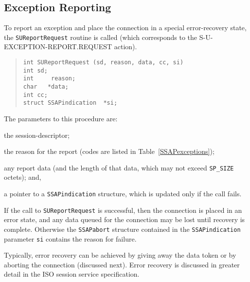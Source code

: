 \subsection	{Exception Reporting}
To report an exception and place the connection in a special error-recovery
state,
the \verb"SUReportRequest" routine is called
(which corresponds to the {\sf S-U-EXCEPTION-REPORT.REQUEST\/} action).
\begin{quote}\small\begin{verbatim}
int	SUReportRequest (sd, reason, data, cc, si)
int	sd;
int     reason;
char   *data;
int	cc;
struct SSAPindication  *si;
\end{verbatim}\end{quote}
The parameters to this procedure are:
\begin{describe}
\item[\verb"sd":] the session-descriptor;

\item[\verb"reason":] the reason for the report
(codes are listed in Table~\ref{SSAPexceptions});

\item[\verb"data"/\verb"cc":] any report data
(and the length of that data, which may not exceed \verb"SP_SIZE" octets);
and,

\item[\verb"si":] a pointer to a \verb"SSAPindication" structure, which is
updated only if the call fails.
\end{describe}
If the call to \verb"SUReportRequest" is successful,
then the connection is placed in an error state,
and any data queued for the connection may be lost until recovery is complete.
Otherwise the \verb"SSAPabort" structure contained in
the \verb"SSAPindication" parameter
\verb"si" contains the reason for failure.

Typically,
error recovery can be achieved by giving away the data token or by aborting
the connection (discussed next).
Error recovery is discussed in greater detail in the ISO session service
specification.

